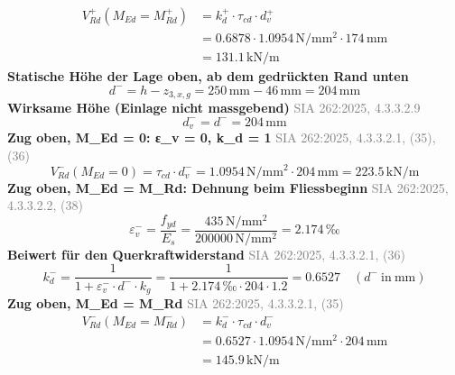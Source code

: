 \documentclass[11pt,a4paper]{article}
\newcommand{\normref}[1]{{\small\textcolor{gray}{#1}}}
\begin{document}
\begin{equation*}
\begin{aligned}
  V_{Rd}^{+}(M_{Ed} = M_{Rd}^{+}) &= k_d^{+} \cdot \tau_{cd} \cdot d_v^{+} \\
  &= 0.6878 \cdot 1.0954\,\mathrm{N}/\mathrm{mm}^{2} \cdot 174\,\mathrm{mm} \\
  &= 131.1\,\mathrm{kN}/\mathrm{m}
\end{aligned}
\end{equation*}
\noindent\textbf{Statische Höhe der Lage oben, ab dem gedrückten Rand unten}
\begin{equation*}
d^{-} = h - z_{3,x,g} = 250\,\mathrm{mm} - 46\,\mathrm{mm} = 204\,\mathrm{mm}
\end{equation*}
\noindent\textbf{Wirksame Höhe (Einlage nicht massgebend)} \hfill \normref{SIA 262:2025, 4.3.3.2.9}
\begin{equation*}
d_v^{-} = d^{-} = 204\,\mathrm{mm}
\end{equation*}
\noindent\textbf{Zug oben, M\_Ed = 0: ε\_v = 0, k\_d = 1} \hfill \normref{SIA 262:2025, 4.3.3.2.1, (35), (36)}
\begin{equation*}
V_{Rd}^{-}(M_{Ed} = 0) = \tau_{cd} \cdot d_v^{-} = 1.0954\,\mathrm{N}/\mathrm{mm}^{2} \cdot 204\,\mathrm{mm} = 223.5\,\mathrm{kN}/\mathrm{m}
\end{equation*}
\noindent\textbf{Zug oben, M\_Ed = M\_Rd: Dehnung beim Fliessbeginn} \hfill \normref{SIA 262:2025, 4.3.3.2.2, (38)}
\begin{equation*}
\varepsilon_v^{-} = \frac{f_{yd}}{E_s} = \frac{435\,\mathrm{N}/\mathrm{mm}^{2}}{200000\,\mathrm{N}/\mathrm{mm}^{2}} = 2.174\,\text{‰}
\end{equation*}
\noindent\textbf{Beiwert für den Querkraftwiderstand} \hfill \normref{SIA 262:2025, 4.3.3.2.1, (36)}
\begin{equation*}
k_d^{-} = \frac{1}{1 + \varepsilon_v^{-} \cdot d^{-} \cdot k_g} = \frac{1}{1 + 2.174\,\text{‰} \cdot 204 \cdot 1.2} = 0.6527 \quad \left(d^{-}\ \text{in}\ \mathrm{mm}\right)
\end{equation*}
\noindent\textbf{Zug oben, M\_Ed = M\_Rd} \hfill \normref{SIA 262:2025, 4.3.3.2.1, (35)}
\begin{equation*}
\begin{aligned}
  V_{Rd}^{-}(M_{Ed} = M_{Rd}^{-}) &= k_d^{-} \cdot \tau_{cd} \cdot d_v^{-} \\
  &= 0.6527 \cdot 1.0954\,\mathrm{N}/\mathrm{mm}^{2} \cdot 204\,\mathrm{mm} \\
  &= 145.9\,\mathrm{kN}/\mathrm{m}
\end{aligned}
\end{equation*}
\end{document}
